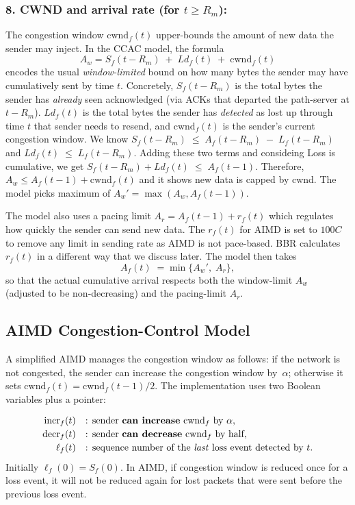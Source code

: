 \documentclass[12pt]{l4dc2023}
\begin{document}
\subsubsection{8. CWND and arrival rate (for \(t\ge R_m\)):}
The congestion window \(\mathrm{cwnd}_f(t)\)  upper-bounds the amount of new data the sender may inject. In the CCAC model, the formula
\[
A_w = S_f(t - R_m) \;+\; Ld_{f}(t) \;+\; \mathrm{cwnd}_f(t)
\]
encodes the usual \emph{window-limited} bound on how many bytes the sender may have cumulatively sent by time \(t\). Concretely, \(S_f(t - R_m)\) is the total bytes the sender has \emph{already} seen acknowledged (via ACKs that departed the path-server at \(t-R_m\)).
\(Ld_{f}(t)\) is the total bytes the sender has \emph{detected} as lost up through time \(t\) that sender needs to resend, and $\mathrm{cwnd}_f(t)$ is the sender's current congestion window. We know $S_f(t - R_m) \;\le\; A_f(t - R_m) \;-\; L_f(t - R_m)$ and $Ld_{f}(t) \;\le\; L_f(t - R_m).$ Adding these two terms and consideing Loss is cumulative, we
get $S_f(t - R_m) + Ld_{f}(t) \;\le\; A_f(t - 1)$. Therefore, $A_w \le A_f(t - 1) + \mathrm{cwnd}_f(t)$ and it shows new data is capped by cwnd. The model picks maximum of $A_w'=\max(A_w, A_f(t-1))$.

The model also uses a pacing limit $A_r = A_f(t - 1) + r_f(t)$ which regulates how quickly the sender can send new data. The $r_f(t)$ for AIMD is set to $100C$ to remove any limit in sending rate as AIMD is not pace-based. BBR calculates $r_f(t)$ in a different way that we discuss later. The model then takes
\[
A_f(t)\;=\min\bigl\{A_w',\;A_r\bigr\},
\]
so that the actual cumulative arrival respects both the window-limit \(A_w\) (adjusted to be non-decreasing) and the pacing-limit \(A_r\). 
 
\subsection{AIMD Congestion-Control Model} \label{aimdSection}

A simplified AIMD manages the congestion window as follows: if the network is not congested, the sender can increase the congestion window by~$\alpha$; otherwise it sets $\mathrm{cwnd}_f(t)=\mathrm{cwnd}_f(t-1)/2$.
The implementation uses two Boolean variables plus a pointer:

\[
\begin{array}{rl}
\mathrm{incr}_f(t) &\text{: sender \textbf{can increase}}
                    \ \mathrm{cwnd}_f \text{ by } \alpha,\\[2pt]
\mathrm{decr}_f(t) &\text{: sender \textbf{can decrease}}
                    \ \mathrm{cwnd}_f \text{ by half},\\[2pt]
\ell_f(t)          &\text{: sequence number of the \emph{last}
                     loss event detected by } t.
\end{array}
\]
Initially $\ell_f(0)=S_f(0)$. In AIMD, if congestion window is reduced once for a loss event, it will not be reduced again for lost packets that were sent before the previous loss event. 
\end{document}
